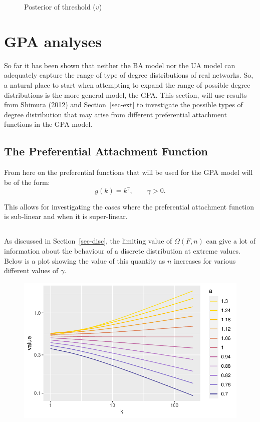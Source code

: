 \documentclass[
  10pt,
  a4paper,
]{scrreprt}
\theoremstyle{plain}
\theoremstyle{plain}
\theoremstyle{definition}
\theoremstyle{plain}
\theoremstyle{remark}
\begin{document}
{\begin{figure}[H]
{}

\caption{\label{fig-thresh}Posterior of threshold (\(v\))}

\end{figure}

\hypertarget{gpa-analyses}{%
\section{GPA analyses}\label{gpa-analyses}}

So far it has been shown that neither the BA model nor the UA model can
adequately capture the range of type of degree distributions of real
networks. So, a natural place to start when attempting to expand the
range of possible degree distributions is the more general model, the
GPA. This section, will use results from Shimura (2012) and
Section~\ref{sec-ext} to investigate the possible types of degree
distribution that may arise from different preferential attachment
functions in the GPA model.

\hypertarget{the-preferential-attachment-function}{%
\subsection{The Preferential Attachment
Function}\label{the-preferential-attachment-function}}

From here on the preferential functions that will be used for the GPA
model will be of the form: \[
g(k) = k^\gamma, \qquad \gamma>0.
\]

This allows for investigating the cases where the preferential
attachment function is sub-linear and when it is super-linear.

\hypertarget{section}{%
\subsection{}\label{section}}

As discussed in Section~\ref{sec-disc}, the limiting value of
\(\Omega(F,n)\) can give a lot of information about the behaviour of a
discrete distribution at extreme values. Below is a plot showing the
value of this quantity as \(n\) increases for various different values
of \(\gamma\).

\begin{figure}[H]

{\centering \includegraphics{doc_files/figure-pdf/fig-omega-1.pdf}

}
\end{figure}}
\end{document}
